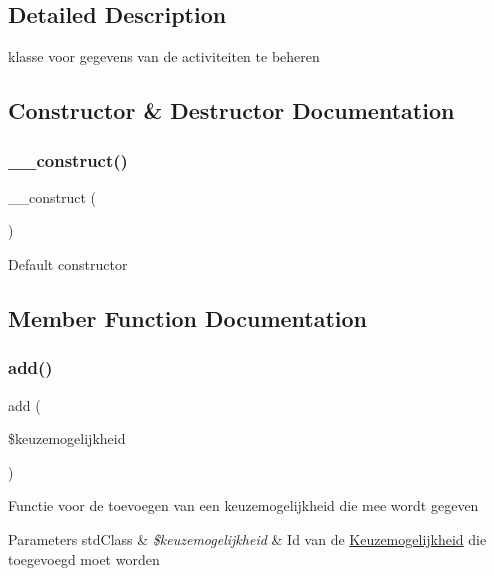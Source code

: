 \subsection{Detailed Description}
klasse voor gegevens van de activiteiten te beheren 

\subsection{Constructor \& Destructor Documentation}
\mbox{\label{class_keuzemogelijkheid___model_a095c5d389db211932136b53f25f39685}} 
\subsubsection{\texorpdfstring{\+\_\+\+\_\+construct()}{\_\_construct()}}
{\footnotesize\ttfamily \+\_\+\+\_\+construct (\begin{DoxyParamCaption}{ }\end{DoxyParamCaption})}

Default constructor 

\subsection{Member Function Documentation}
\mbox{\label{class_keuzemogelijkheid___model_ab3ea46c3ea11cbb463eb98238e38c580}} 
\subsubsection{\texorpdfstring{add()}{add()}}
{\footnotesize\ttfamily add (\begin{DoxyParamCaption}\item[{}]{\$keuzemogelijkheid }\end{DoxyParamCaption})}

Functie voor de toevoegen van een keuzemogelijkheid die mee wordt gegeven 
\begin{DoxyParams}[1]{Parameters}
std\+Class & {\em \$keuzemogelijkheid} & Id van de \mbox{\hyperlink{class_keuzemogelijkheid}{Keuzemogelijkheid}} die toegevoegd moet worden \\
\hline
\end{DoxyParams}
\mbox{\label{class_keuzemogelijkheid___model_a2f8258add505482d7f00ea26493a5723}} 
